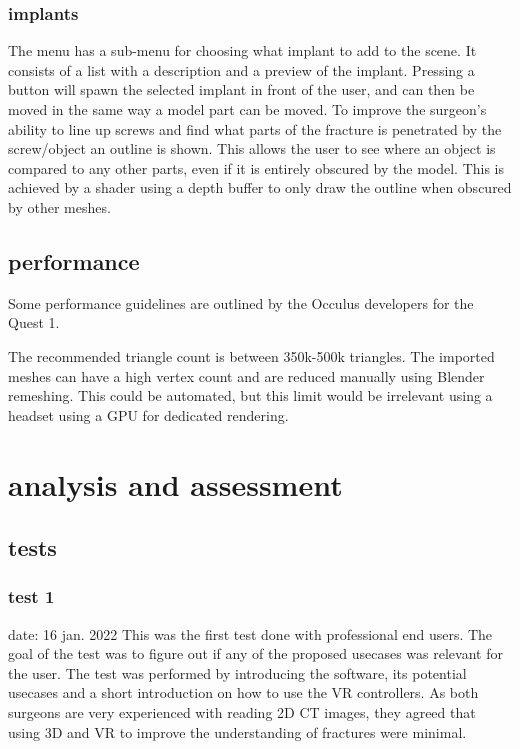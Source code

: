 \documentclass[a4paper]{report}
\begin{document}
\subsection{implants}
The menu has a sub-menu for choosing what implant to add to the scene. It consists of a list with a description and a preview of the implant. Pressing a button will spawn the selected implant in front of the user, and can then be moved in the same way a model part can be moved.
To improve the surgeon's ability to line up screws and find what parts of the fracture is penetrated by the screw/object an outline is shown. This allows the user to see where an object is compared to any other parts, even if it is entirely obscured by the model. This is achieved by a shader using a depth buffer to only draw the outline when obscured by other meshes\cite{shader depth}.

\section{performance}
Some performance guidelines are outlined by the Occulus developers for the Quest 1\cite{performance}.

The recommended triangle count is between 350k-500k triangles. The imported meshes can have a high vertex count and are reduced manually using Blender remeshing.
This could be automated, but this limit would be irrelevant using a headset using a GPU for dedicated rendering.


\chapter{analysis and assessment}\label{analysis and assessment}

\section{tests}


\subsection{test 1}
date: 16 jan. 2022
This was the first test done with professional end users. The goal of the test was to figure out if any of the proposed usecases was relevant for the user. The test was performed by introducing the software, its potential usecases and a short introduction on how to use the VR controllers.
As both surgeons are very experienced with reading 2D CT images, they agreed that using 3D and VR to improve the understanding of fractures were minimal.
\end{document}
